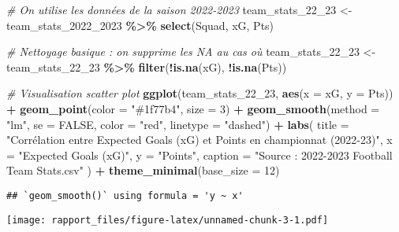 \documentclass[
]{article}
\newenvironment{Shaded}{\begin{snugshade}}{\end{snugshade}}
\newcommand{\AttributeTok}[1]{\textcolor[rgb]{0.13,0.29,0.53}{#1}}
\newcommand{\CommentTok}[1]{\textcolor[rgb]{0.56,0.35,0.01}{\textit{#1}}}
\newcommand{\ConstantTok}[1]{\textcolor[rgb]{0.56,0.35,0.01}{#1}}
\newcommand{\DecValTok}[1]{\textcolor[rgb]{0.00,0.00,0.81}{#1}}
\newcommand{\FunctionTok}[1]{\textcolor[rgb]{0.13,0.29,0.53}{\textbf{#1}}}
\newcommand{\NormalTok}[1]{#1}
\newcommand{\OtherTok}[1]{\textcolor[rgb]{0.56,0.35,0.01}{#1}}
\newcommand{\SpecialCharTok}[1]{\textcolor[rgb]{0.81,0.36,0.00}{\textbf{#1}}}
\newcommand{\StringTok}[1]{\textcolor[rgb]{0.31,0.60,0.02}{#1}}
\begin{document}
\begin{Shaded}
\begin{Highlighting}[]
\CommentTok{\# On utilise les données de la saison 2022{-}2023}
\NormalTok{team\_stats\_22\_23 }\OtherTok{\textless{}{-}}\NormalTok{ team\_stats\_2022\_2023 }\SpecialCharTok{\%\textgreater{}\%}
  \FunctionTok{select}\NormalTok{(Squad, xG, Pts)}

\CommentTok{\# Nettoyage basique : on supprime les NA au cas où}
\NormalTok{team\_stats\_22\_23 }\OtherTok{\textless{}{-}}\NormalTok{ team\_stats\_22\_23 }\SpecialCharTok{\%\textgreater{}\%}
  \FunctionTok{filter}\NormalTok{(}\SpecialCharTok{!}\FunctionTok{is.na}\NormalTok{(xG), }\SpecialCharTok{!}\FunctionTok{is.na}\NormalTok{(Pts))}

\CommentTok{\# Visualisation scatter plot}
\FunctionTok{ggplot}\NormalTok{(team\_stats\_22\_23, }\FunctionTok{aes}\NormalTok{(}\AttributeTok{x =}\NormalTok{ xG, }\AttributeTok{y =}\NormalTok{ Pts)) }\SpecialCharTok{+}
  \FunctionTok{geom\_point}\NormalTok{(}\AttributeTok{color =} \StringTok{"\#1f77b4"}\NormalTok{, }\AttributeTok{size =} \DecValTok{3}\NormalTok{) }\SpecialCharTok{+}
  \FunctionTok{geom\_smooth}\NormalTok{(}\AttributeTok{method =} \StringTok{"lm"}\NormalTok{, }\AttributeTok{se =} \ConstantTok{FALSE}\NormalTok{, }\AttributeTok{color =} \StringTok{"red"}\NormalTok{, }\AttributeTok{linetype =} \StringTok{"dashed"}\NormalTok{) }\SpecialCharTok{+}
  \FunctionTok{labs}\NormalTok{(}
    \AttributeTok{title =} \StringTok{"Corrélation entre Expected Goals (xG) et Points en championnat (2022{-}23)"}\NormalTok{,}
    \AttributeTok{x =} \StringTok{"Expected Goals (xG)"}\NormalTok{,}
    \AttributeTok{y =} \StringTok{"Points"}\NormalTok{,}
    \AttributeTok{caption =} \StringTok{"Source : 2022{-}2023 Football Team Stats.csv"}
\NormalTok{  ) }\SpecialCharTok{+}
  \FunctionTok{theme\_minimal}\NormalTok{(}\AttributeTok{base\_size =} \DecValTok{12}\NormalTok{)}
\end{Highlighting}
\end{Shaded}

\begin{verbatim}
## `geom_smooth()` using formula = 'y ~ x'
\end{verbatim}

\texttt{[image: rapport\_files/figure-latex/unnamed-chunk-3-1.pdf]}

\begin{Shaded}
\end{Shaded}
\end{document}
